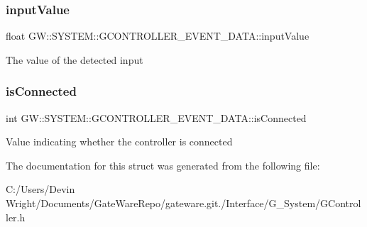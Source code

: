 \subsubsection{\texorpdfstring{input\+Value}{inputValue}}
{\footnotesize\ttfamily float G\+W\+::\+S\+Y\+S\+T\+E\+M\+::\+G\+C\+O\+N\+T\+R\+O\+L\+L\+E\+R\+\_\+\+E\+V\+E\+N\+T\+\_\+\+D\+A\+T\+A\+::input\+Value}

The value of the detected input \mbox{\label{struct_g_w_1_1_s_y_s_t_e_m_1_1_g_c_o_n_t_r_o_l_l_e_r___e_v_e_n_t___d_a_t_a_a75772bfa2f01fe8408ffec36be9f0c70}} 
\subsubsection{\texorpdfstring{is\+Connected}{isConnected}}
{\footnotesize\ttfamily int G\+W\+::\+S\+Y\+S\+T\+E\+M\+::\+G\+C\+O\+N\+T\+R\+O\+L\+L\+E\+R\+\_\+\+E\+V\+E\+N\+T\+\_\+\+D\+A\+T\+A\+::is\+Connected}

Value indicating whether the controller is connected 

The documentation for this struct was generated from the following file\+:\begin{DoxyCompactItemize}
\item 
C\+:/\+Users/\+Devin Wright/\+Documents/\+Gate\+Ware\+Repo/gateware.\+git./\+Interface/\+G\+\_\+\+System/G\+Controller.\+h\end{DoxyCompactItemize}
